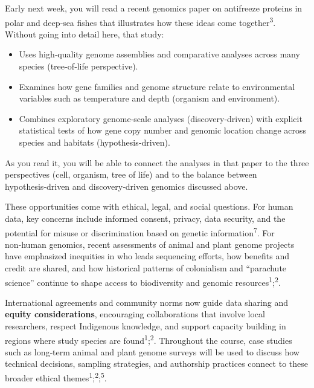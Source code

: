 \documentclass[
  letterpaper,
  DIV=11,
  numbers=noendperiod]{scrreprt}
\providecommand{\tightlist}{%
  \setlength{\itemsep}{0pt}\setlength{\parskip}{0pt}}
\begin{document}
Early next week, you will read a recent genomics paper on antifreeze
proteins in polar and deep‑sea fishes that illustrates how these ideas
come together\textsuperscript{3}. Without going into detail here, that
study:

\begin{itemize}
\tightlist
\item
  Uses high‑quality genome assemblies and comparative analyses across
  many species (tree‑of‑life perspective).
\item
  Examines how gene families and genome structure relate to
  environmental variables such as temperature and depth (organism and
  environment).
\item
  Combines exploratory genome‑scale analyses (discovery‑driven) with
  explicit statistical tests of how gene copy number and genomic
  location change across species and habitats (hypothesis‑driven).
\end{itemize}

As you read it, you will be able to connect the analyses in that paper
to the three perspectives (cell, organism, tree of life) and to the
balance between hypothesis‑driven and discovery‑driven genomics
discussed above.

These opportunities come with ethical, legal, and social questions. For
human data, key concerns include informed consent, privacy, data
security, and the potential for misuse or discrimination based on
genetic information\textsuperscript{7}. For non‑human genomics, recent
assessments of animal and plant genome projects have emphasized
inequities in who leads sequencing efforts, how benefits and credit are
shared, and how historical patterns of colonialism and ``parachute
science'' continue to shape access to biodiversity and genomic
resources\textsuperscript{1};\textsuperscript{2}.

International agreements and community norms now guide data sharing and
\textbf{equity considerations}, encouraging collaborations that involve
local researchers, respect Indigenous knowledge, and support capacity
building in regions where study species are
found\textsuperscript{1};\textsuperscript{2}. Throughout the course,
case studies such as long‑term animal and plant genome surveys will be
used to discuss how technical decisions, sampling strategies, and
authorship practices connect to these broader ethical
themes\textsuperscript{1};\textsuperscript{2};\textsuperscript{5}.
\end{document}
